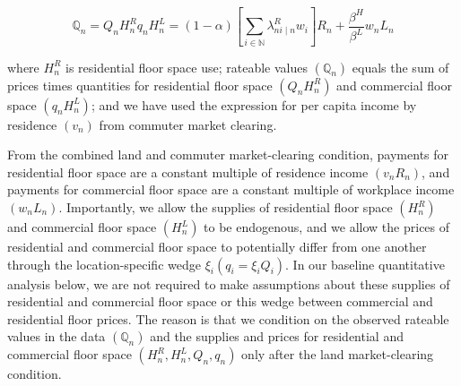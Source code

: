 \begin{equation}
    \mathbb{Q}_n = Q_n H_n^R q_n H_n^L = (1 - \alpha) \left[ \sum_{i \in \mathbb{N}} \lambda_{ni \mid n}^R w_i \right] R_n + \frac{\beta^H}{\beta^L} w_n L_n
\end{equation}

where $H_n^R$ is residential floor space use; rateable values $(\mathbb{Q}_n)$ equals the sum of prices times quantities for residential floor space $(Q_n H_n^R)$ and commercial floor space $(q_n H_n^L)$; and we have used the expression for per capita income by residence $(v_n)$ from commuter market clearing.

From the combined land and commuter market-clearing condition, payments for residential floor space are a constant multiple of residence income $(v_n R_n)$, and payments for commercial floor space are a constant multiple of workplace income $(w_n L_n)$. Importantly, we allow the supplies of residential floor space $(H_n^R)$ and commercial floor space $(H_n^L)$ to be endogenous, and we allow the prices of residential and commercial floor space to potentially differ from one another through the location-specific wedge $\xi_i(q_i = \xi_i Q_i)$. In our baseline quantitative analysis below, we are not required to make assumptions about these supplies of residential and commercial floor space or this wedge between commercial and residential floor prices. The reason is that we condition on the observed rateable values in the data $(\mathbb{Q}_n)$ and the supplies and prices for residential and commercial floor space $(H_n^R, H_n^L, Q_n, q_n)$ only after the land market-clearing condition.
